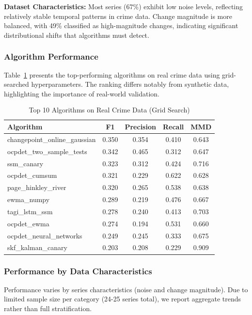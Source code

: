 \textbf{Dataset Characteristics:} Most series (67\%) exhibit low noise levels, reflecting relatively stable temporal patterns in crime data. Change magnitude is more balanced, with 49\% classified as high-magnitude changes, indicating significant distributional shifts that algorithms must detect.


\subsubsection{Algorithm Performance}

Table~\ref{tab:real_top10} presents the top-performing algorithms on real crime data using grid-searched hyperparameters. The ranking differs notably from synthetic data, highlighting the importance of real-world validation.

\begin{table}[H]
\centering
\caption{Top 10 Algorithms on Real Crime Data (Grid Search)}
\label{tab:real_top10}
\small
\begin{tabular}{lcccc}
\toprule
\textbf{Algorithm} & \textbf{F1} & \textbf{Precision} & \textbf{Recall} & \textbf{MMD} \\
\midrule
changepoint\_online\_gaussian & 0.350 & 0.354 & 0.410 & 0.643 \\
ocpdet\_two\_sample\_tests & 0.342 & 0.465 & 0.312 & 0.647 \\
ssm\_canary & 0.323 & 0.312 & 0.424 & 0.716 \\
ocpdet\_cumsum & 0.321 & 0.229 & 0.622 & 0.628 \\
page\_hinkley\_river & 0.320 & 0.265 & 0.538 & 0.638 \\
ewma\_numpy & 0.289 & 0.219 & 0.476 & 0.667 \\
tagi\_lstm\_ssm & 0.278 & 0.240 & 0.413 & 0.703 \\
ocpdet\_ewma & 0.274 & 0.194 & 0.531 & 0.660 \\
ocpdet\_neural\_networks & 0.249 & 0.245 & 0.333 & 0.675 \\
skf\_kalman\_canary & 0.203 & 0.208 & 0.229 & 0.909 \\
\bottomrule
\end{tabular}
\end{table}


\subsubsection{Performance by Data Characteristics}

Performance varies by series characteristics (noise and change magnitude). Due to limited sample size per category (24-25 series total), we report aggregate trends rather than full stratification.



